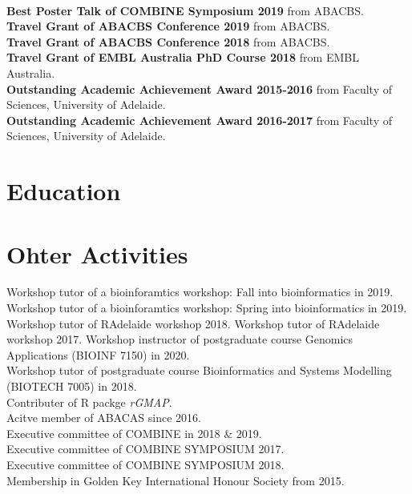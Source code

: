 \documentclass[]{deedy-resume-openfont}
\begin{document}
\\
\textbf{Best Poster Talk of COMBINE Symposium 2019} from ABACBS.\\
\textbf{Travel Grant of ABACBS Conference 2019} from ABACBS.\\
\textbf{Travel Grant of ABACBS Conference 2018} from ABACBS.\\
\textbf{Travel Grant of EMBL Australia PhD Course 2018} from EMBL Australia.\\
\textbf{Outstanding Academic Achievement Award 2015-2016} from Faculty of Sciences, University of Adelaide.\\
\textbf{Outstanding Academic Achievement Award 2016-2017} from Faculty of Sciences, University of Adelaide.\\
\sectionsep

\section{Education}
\sectionsep

\sectionsep

\sectionsep

\section{Ohter Activities}
Workshop tutor of a bioinforamtics workshop: Fall into bioinformatics in 2019.
Workshop tutor of a bioinforamtics workshop: Spring into bioinformatics in 2019.
Workshop tutor of RAdelaide workshop 2018.
Workshop tutor of RAdelaide workshop 2017.
Workshop instructor of postgraduate course Genomics Applications (BIOINF 7150) in 2020.\\
Workshop tutor of postgraduate course Bioinformatics and Systems Modelling (BIOTECH 7005) in 2018.\\
Contributer of R packge \textit{rGMAP}.\\
Acitve member of ABACAS since 2016.\\
Executive committee of COMBINE in 2018 \& 2019.\\
Executive committee of COMBINE SYMPOSIUM 2017.\\
Executive committee of COMBINE SYMPOSIUM 2018.\\
Membership in Golden Key International Honour Society from 2015.\\
\end{document}
